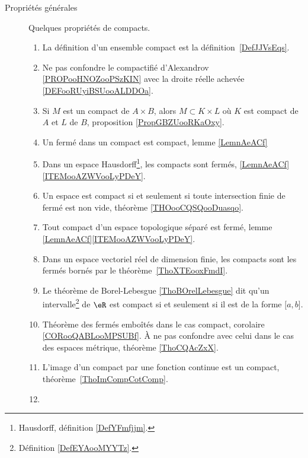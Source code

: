 
        \label{THEMEooQQBHooLcqoKB}
\begin{description}

	\item[Propriétés générales]

	      Quelques propriétés de compacts.

	      \begin{enumerate}
		      \item
		            La définition d'un ensemble compact est la définition~\ref{DefJJVsEqs}.
		      \item
		            Ne pas confondre le compactifié d'Alexandrov \ref{PROPooHNOZooPSzKIN} avec la droite réelle achevée \ref{DEFooRUyiBSUooALDDOa}.
		      \item
		            Si \( M\) est un compact de \( A\times B\), alors \( M\subset K\times L\) où \( K\) est compact de \( A\) et \( L\) de \( B\), proposition \ref{PropGBZUooRKaOxy}.
		      \item
		            Un fermé dans un compact est compact, lemme \ref{LemnAeACf}
		      \item
		            Dans un espace Hausdorff\footnote{Hausdorff, définition \ref{DefYFmfjjm}.}, les compacts sont fermés, \ref{LemnAeACf}\ref{ITEMooAZWVooLyPDeY}.
		      \item
		            Un espace est compact si et seulement si toute intersection finie de fermé est non vide, théorème \ref{THOooCQSQooDuasqo}.
		      \item
		            Tout compact d'un espace topologique séparé est fermé, lemme \ref{LemnAeACf}\ref{ITEMooAZWVooLyPDeY}.
		      \item
		            Dans un espace vectoriel réel de dimension finie, les compacts sont les fermés bornés par le théorème~\ref{ThoXTEooxFmdI}.
		      \item
		            Le théorème de Borel-Lebesgue \ref{ThoBOrelLebesgue} dit qu'un intervalle\footnote{Définition \ref{DefEYAooMYYTz}.} de \( \eR\) est compact si et seulement si il est de la forme \( \mathopen[ a , b \mathclose]\).
		      \item
		            Théorème des fermés emboîtés dans le cas compact, corolaire \ref{CORooQABLooMPSUBf}. À ne pas confondre avec celui dans le cas des espaces métrique, théorème \ref{ThoCQAcZxX}.
		      \item
		            L'image d'un compact par une fonction continue est un compact, théorème~\ref{ThoImCompCotComp}.
		      \item

\end{enumerate}
\end{description}
